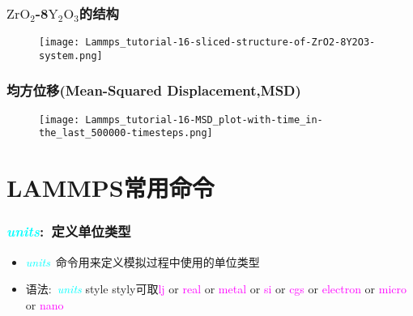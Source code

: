 \frame
{
	\frametitle{$\mathrm{ZrO}_2$-\textrm{8}$\mathrm{Y}_2\mathrm{O}_3$的结构}
\begin{figure}[h!]
\centering
\vskip -5pt
\texttt{[image: Lammps\_tutorial-16-sliced-structure-of-ZrO2-8Y2O3-system.png]}
\caption{\fontsize{6.2pt}{5.2pt}}%
\label{LAMMPS_slice-structure-of-ZrO2-8Y2O3}
\end{figure}
}


\frame
{
	\frametitle{均方位移\textrm{(Mean-Squared Displacement,MSD)}}
\begin{figure}[h!]
\centering
\vskip -5pt
\texttt{[image: Lammps\_tutorial-16-MSD\_plot-with-time\_in-the\_last\_500000-timesteps.png]}
\caption{\fontsize{6.2pt}{5.2pt}}%
\label{LAMMPS_MSD-ZrO2-8Y2O3.}
\end{figure}
}

\section{\rm{LAMMPS}常用命令}
\frame
{
	\frametitle{\textcolor{cyan}{\textit{units}}:~定义单位类型}
	\begin{itemize}
		\item \textcolor{cyan}{\textit{units}}~命令用来定义模拟过程中使用的单位类型\\
			{\fontsize{7.5pt}{5.2pt}}
		\item 语法:~\textcolor{cyan}{\textit{units}} \textrm{style}
\vskip 3pt
\textrm{styly}可取\textrm{\textcolor{magenta}{lj} or \textcolor{magenta}{real} or \textcolor{magenta}{metal} or \textcolor{magenta}{si} or \textcolor{magenta}{cgs} or \textcolor{magenta}{electron} or \textcolor{magenta}{micro} or \textcolor{magenta}{nano}}\\
{\fontsize{7.5pt}{5.2pt}}
	\end{itemize}
}

